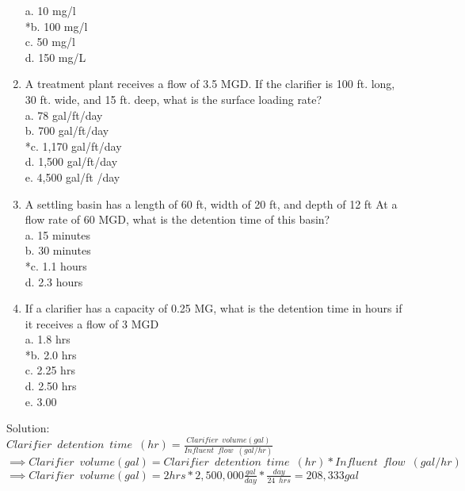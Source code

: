\begin{enumerate}
a. 10 mg/l \\
*b. 100 mg/l \\
c. 50 mg/l \\
d. 150 mg/L \\


\item  A treatment plant receives a flow of 3.5 MGD.  If the clarifier is 100 ft. long, 30 ft. wide, and 15 ft. deep, what is the surface loading rate? \\

a. 78 gal/ft/day \\
b. 700 gal/ft/day \\
*c. 1,170 gal/ft/day \\
d. 1,500 gal/ft/day \\
e. 4,500 gal/ft /day \\


\item  A settling basin has a length of 60 ft, width of 20 ft, and depth of 12 ft At a flow rate of 60 MGD, what is the detention time of this basin? \\

a. 15 minutes \\
b. 30 minutes \\
*c. 1.1 hours \\
d. 2.3 hours \\


\item  If a clarifier has a capacity of 0.25 MG, what is the detention time in hours if it receives a flow of 3 MGD \\

a. 1.8 hrs \\
*b. 2.0 hrs \\
c. 2.25 hrs \\
d. 2.50 hrs \\
e. 3.00 \\
\end{enumerate}

\vspace{0.25cm}
Solution:\\
\vspace{0.25cm}
$Clarifier \enspace detention \enspace time \enspace (hr) = 	\frac{ Clarifier \enspace volume (gal)}{Influent \enspace flow \enspace (gal/hr)}$\\
\vspace{0.3cm}
$\implies Clarifier \enspace volume (gal)= Clarifier \enspace detention \enspace time \enspace (hr) * Influent \enspace flow \enspace (gal/hr)$\\
\vspace{0.3cm}
$\implies Clarifier \enspace volume (gal)= 2 hrs * 2,500,000\frac{gal}{day}*\frac{day}{24 \enspace hrs}=\boxed{208,333 gal}$\\




